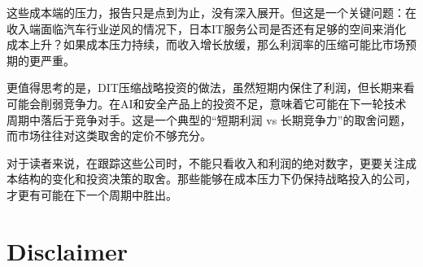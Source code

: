 \documentclass[11pt]{ctexart}
\begin{document}
这些成本端的压力，报告只是点到为止，没有深入展开。但这是一个关键问题：在收入端面临汽车行业逆风的情况下，日本IT服务公司是否还有足够的空间来消化成本上升？如果成本压力持续，而收入增长放缓，那么利润率的压缩可能比市场预期的更严重。

更值得思考的是，DIT压缩战略投资的做法，虽然短期内保住了利润，但长期来看可能会削弱竞争力。在AI和安全产品上的投资不足，意味着它可能在下一轮技术周期中落后于竞争对手。这是一个典型的“短期利润 vs 长期竞争力”的取舍问题，而市场往往对这类取舍的定价不够充分。

对于读者来说，在跟踪这些公司时，不能只看收入和利润的绝对数字，更要关注成本结构的变化和投资决策的取舍。那些能够在成本压力下仍保持战略投入的公司，才更有可能在下一个周期中胜出。

\section{Disclaimer}
\end{document}
